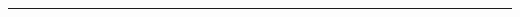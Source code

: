 \documentclass[10pt,landscape,a4paper]{article}
\begin{document}
\small
\begin{multicols*}{5}
	
\setcounter{section}{0}
 \hrule


\end{multicols*}
\end{document}
